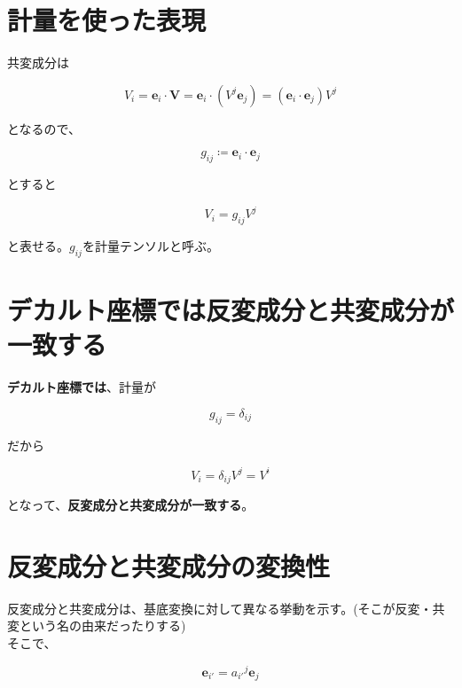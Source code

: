 \documentclass[a4paper,11pt]{article}
\begin{document}
\newpage

\section{計量を使った表現}

共変成分は

\begin{equation}
  V_i = \mathbf{e}_i \cdot \mathbf{V}
  = \mathbf{e}_i \cdot (V^j \mathbf{e}_j)
  = (\mathbf{e}_i \cdot \mathbf{e}_j)V^j
\end{equation}

\noindent
となるので、

\begin{equation}
  g_{ij} \coloneqq \mathbf{e}_i \cdot \mathbf{e}_j
\end{equation}

\noindent
とすると

\begin{equation}
  V_i = g_{ij}V^j
\end{equation}

\noindent
と表せる。$g_{ij}$を計量テンソルと呼ぶ。

\section{デカルト座標では反変成分と共変成分が一致する}

\textbf{デカルト座標では}、計量が

\begin{equation}
  g_{ij} = \delta_{ij}
\end{equation}

\noindent
だから

\begin{equation}
  V_i = \delta_{ij}V^j = V^i
\end{equation}

\noindent
となって、\textbf{反変成分と共変成分が一致する}。


\section{反変成分と共変成分の変換性}

反変成分と共変成分は、基底変換に対して異なる挙動を示す。(そこが反変・共変という名の由来だったりする)\\
そこで、

\begin{equation}
  \mathbf{e}_{i'} = a_{i'}{}^j \mathbf{e}_j
  \label{eq:base_change}
\end{equation}
\end{document}
